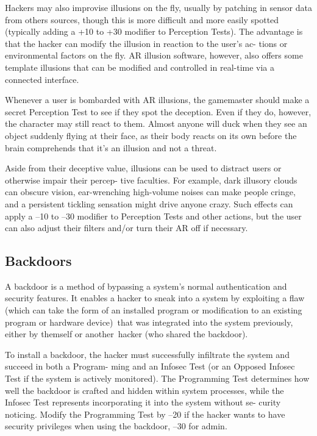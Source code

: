 Hackers may also improvise illusions on the 
fly, usually by patching in sensor data from others 
sources, though this is more difficult and more easily 
spotted (typically adding a +10 to +30 modifier to 
Perception Tests). The advantage is that the hacker 
can modify the illusion in reaction to the user's ac-
tions or environmental factors on the fly. AR illusion 
software, however, also offers some template illusions 
that can be modified and controlled in real-time via a 
connected interface.

Whenever a user is bombarded with AR illusions, the 
gamemaster should make a secret Perception Test to see 
if they spot the deception. Even if they do, however, the 
character may still react to them. Almost anyone will 
duck when they see an object suddenly flying at their 
face, as their body reacts on its own before the brain 
comprehends that it's an illusion and not a threat.

Aside from their deceptive value, illusions can be 
used to distract users or otherwise impair their percep-
tive faculties. For example, dark illusory clouds can 
obscure vision, ear-wrenching high-volume noises can 
make people cringe, and a persistent tickling sensation 
might drive anyone crazy. Such effects can apply a –10 
to –30 modifier to Perception Tests and other actions, 
but the user can also adjust their filters and/or turn 
their AR off if necessary.

\subsection{Backdoors}

A backdoor is a method of bypassing a system's normal 
authentication and security features. It enables a hacker 
to sneak into a system by exploiting a flaw (which can 
take the form of an installed program or modification 
to an existing program or hardware device) that was 
integrated into the system previously, either by themself 
or another hacker (who shared the backdoor).

To install a backdoor, the hacker must successfully 
infiltrate the system and succeed in both a Program-
ming and an Infosec Test (or an Opposed Infosec Test 
if the system is actively monitored). The Programming 
Test determines how well the backdoor is crafted and 
hidden within system processes, while the Infosec Test 
represents incorporating it into the system without se-
curity noticing. Modify the Programming Test by –20 
if the hacker wants to have security privileges when 
using the backdoor, –30 for admin.

